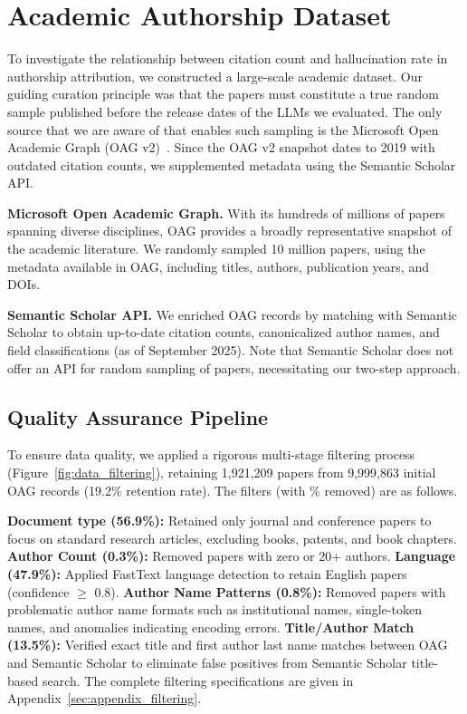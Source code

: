 \documentclass[11pt]{article}
\begin{document}
\section{Academic Authorship Dataset}
\label{sec:dataset}

To investigate the relationship between citation count and hallucination rate in authorship attribution, we constructed a large-scale academic dataset.
Our guiding curation principle was that the papers must constitute a true
random sample published before the release dates of the LLMs we evaluated. The only source that we are aware of that enables such sampling is the Microsoft Open Academic Graph (OAG v2)~\cite{OAGv2}. Since the OAG v2 snapshot dates to 2019 with outdated citation counts, we supplemented metadata using the Semantic Scholar API.

\textbf{Microsoft Open Academic Graph.} With its hundreds of millions of papers spanning diverse disciplines, OAG provides a broadly representative snapshot of the academic literature. We randomly sampled 10 million papers, using the metadata available in OAG, including titles, authors, publication years, and DOIs.

\textbf{Semantic Scholar API.} We enriched OAG records by matching with Semantic Scholar to obtain up-to-date citation counts, canonicalized author names, and field classifications (as of September 2025). Note that Semantic Scholar does not offer an API for random sampling of papers, necessitating our two-step approach.

\subsection{Quality Assurance Pipeline}

To ensure data quality, we applied a rigorous multi-stage filtering process (Figure~\ref{fig:data_filtering}), retaining 1,921,209 papers from 9,999,863 initial OAG records (19.2\% retention rate).
The filters (with \% removed) are as follows.

\textbf{Document type (56.9\%):} Retained only journal and conference papers to focus on standard research articles, excluding books, patents, and book chapters.
\textbf{Author Count (0.3\%):} Removed papers with zero or 20+ authors.
\textbf{Language (47.9\%):} Applied FastText language detection to retain English papers (confidence $\geq$ 0.8).
\textbf{Author Name Patterns (0.8\%):} Removed papers with problematic author name formats such as institutional names, single-token names, and anomalies indicating encoding errors.
\textbf{Title/Author Match (13.5\%):} Verified exact title and first author last name matches between OAG and Semantic Scholar to eliminate false positives from Semantic Scholar title-based search.
The complete filtering specifications are given in  Appendix~\ref{sec:appendix_filtering}.
\end{document}
